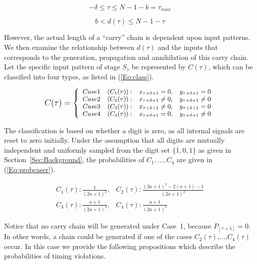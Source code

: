 \documentclass[journal]{IEEEtran}
\begin{document}
\begin{equation}\label{Eq:Bound_GenChain}
 -\delta\leq \tau\leq N-1-b=\tau_{max}
\end{equation}


\begin{equation}\label{Eq:Bound_ChainLength}
  b<d(\tau)\leq N-1-\tau
\end{equation}
%


\noindent However, the actual length of a ``carry'' chain is dependent upon input patterns. We then examine the relationship between $d(\tau)$ and the inputs that corresponds to the generation, propagation and annihilation of this carry chain.  Let the specific input pattern of stage $S_{\tau}$ be represented by $C(\tau)$, which can be classified into four types, as listed in (\ref{Eq:class}). 

\begin{equation}\label{Eq:class}
\footnotesize
    C(\tau)= \left\{ \begin{array}{llll}
        Case 1 & (C_1(\tau)): & x_{\tau +\delta+1}=0, & y_{\tau +\delta+1}=0\\
        Case 2 & (C_2(\tau)): & x_{\tau +\delta+1}\neq 0, & y_{\tau +\delta+1}\neq 0\\
        Case 3 & (C_3(\tau)): & x_{\tau +\delta+1}\neq 0, & y_{\tau +\delta+1}=0\\
        Case 4 & (C_4(\tau)): & x_{\tau +\delta+1}=0, & y_{\tau +\delta+1}\neq 0
\end{array} \right.
\normalsize
\end{equation}

\noindent The classification is based on whether a digit is zero, as all internal signals are reset to zero initially. Under the assumption that all digits are mutually independent and uniformly sampled from the digit set  $\{\overline{1},0,1\}$ as given in Section~\ref{Sec:Background}, the probabilities of $C_1,...,C_4$ are given in (\ref{Eq:probcaser}).

\begin{equation}\label{Eq:probcaser}
\begin{array}{ll}
C_1(\tau): \frac{1}{(2a+1)^2}, &  C_2(\tau): \frac{(2a+1)^2-2(a+1)-1}{(2a+1)^2}\\
C_3(\tau):\frac{a+1}{(2a+1)^2}, & C_4(\tau):  \frac{a+1}{(2a+1)^2}
\end{array}
\end{equation}

Notice that no carry chain will be generated under Case~1, because $P_{[\tau+1]}=0$. In other words, a chain could be generated if one of  the cases $C_2(\tau)$,...,$C_4(\tau)$ occur. In this case we provide the following propositions which describe the probabilities of timing violations.
\end{document}
